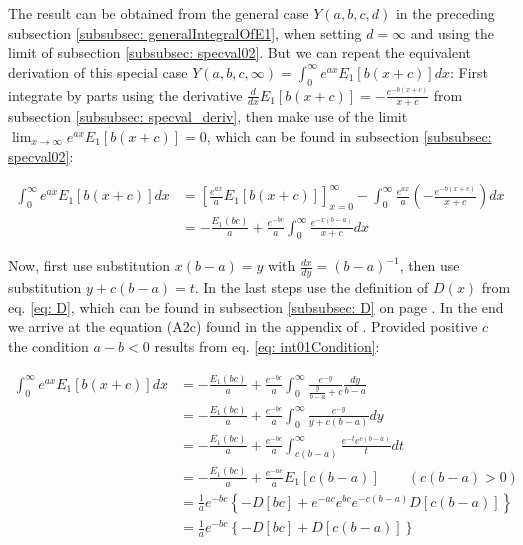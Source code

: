 \documentclass[bibliography=totocnumbered]{scrartcl}
\begin{document}
	
	The result can be obtained from the general case $Y\left(a, b, c, d\right)$ in the preceding subsection \ref{subsubsec: generalIntegralOfE1}, when setting $d=\infty$ and using the limit of subsection \ref{subsubsec: specval02}. But we can repeat the equivalent derivation of this special case $Y\left(a, b, c, \infty\right)=\int_{0}^{\infty}e^{ax}E_1\left[b\left(x+c\right)\right]dx$: First integrate by parts using the derivative $\frac{d}{dx}E_1\left[b\left(x+c\right)\right]=-\frac{e^{-b\left(x+c\right)}}{x+c}$ from subsection \ref{subsubsec: specval_deriv}, then make use of the limit $\lim_{x\rightarrow\infty}e^{ax}E_1\left[b\left(x+c\right)\right]=0$, which can be found in subsection \ref{subsubsec: specval02}:
	
	\begin{align}
		\int_{0}^{\infty}e^{ax}E_1\left[b\left(x+c\right)\right]dx&=\left[\frac{e^{ax}}{a}E_1\left[b\left(x+c\right)\right]\right]^{\infty}_{x=0}-\int_{0}^{\infty}\frac{e^{ax}}{a}\left(-\frac{e^{-b\left(x+c\right)}}{x+c}\right)dx\\
		&=-\frac{E_1\left(bc\right)}{a}+\frac{e^{-bc}}{a}\int_{0}^{\infty}\frac{e^{-x\left(b-a\right)}}{x+c}dx
	\end{align}
	
	Now, first use substitution $x\left(b-a\right)=y$ with $\frac{dx}{dy}=\left(b-a\right)^{-1}$, then use substitution $y+c\left(b-a\right)=t$. In the last steps use the definition of $D\left(x\right)$ from eq. \eqref{eq: D}, which can be found in subsection \ref{subsubsec: D} on page \pageref{subsubsec: D}. In the end we arrive at the equation (A2c) found in the appendix of \cite{boer1990calc}. Provided positive $c$ the condition $a-b<0$ results from eq. \eqref{eq: int01Condition}:
	
	\begin{align}
		\int_{0}^{\infty}e^{ax}E_1\left[b\left(x+c\right)\right]dx&=-\frac{E_1\left(bc\right)}{a}+\frac{e^{-bc}}{a}\int_{0}^{\infty}\frac{e^{-y}}{\frac{y}{b-a}+c}\frac{dy}{b-a}\\
		&=-\frac{E_1\left(bc\right)}{a}+\frac{e^{-bc}}{a}\int_{0}^{\infty}\frac{e^{-y}}{y+c\left(b-a\right)}dy\\
		&=-\frac{E_1\left(bc\right)}{a}+\frac{e^{-bc}}{a}\int_{c\left(b-a\right)}^{\infty}\frac{e^{-t}e^{c\left(b-a\right)}}{t}dt\\	&=-\frac{E_1\left(bc\right)}{a}+\frac{e^{-ac}}{a}E_1\left[c\left(b-a\right)\right]\qquad\left(c\left(b-a\right)>0\right)\label{eq: int01Condition}\\
		&=\frac{1}{a}e^{-bc}\left\{-D\left[bc\right]+e^{-ac}e^{bc}e^{-c\left(b-a\right)}D\left[c\left(b-a\right)\right]\right\}\\
		&=\frac{1}{a}e^{-bc}\left\{-D\left[bc\right]+D\left[c\left(b-a\right)\right]\right\}\label{eq: generalIntegralOfE2}
	\end{align}
	
\end{document}
